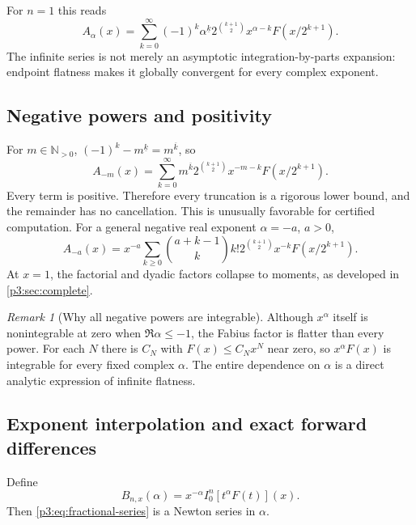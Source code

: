 \documentclass[11pt,oneside]{article}
\theoremstyle{definition}
\theoremstyle{remark}
\newtheorem{remark}[theorem]{Remark}
\newcommand{\N}{\mathbb N}
\newcommand{\fall}[2]{#1^{\underline{#2}}}
\newcommand{\rise}[2]{#1^{\overline{#2}}}
\newcommand{\1}{\mathbf 1}
\begin{document}
For $n=1$ this reads
\begin{equation}
 \boxed{
 A_\alpha(x)=
 \sum_{k=0}^{\infty}(-1)^k\fall\alpha k
 2^{\binom{k+1}{2}}x^{\alpha-k}F(x/2^{k+1}).}
 \label{p3:eq:A-series}
\end{equation}
The infinite series is not merely an asymptotic integration-by-parts expansion: endpoint
flatness makes it globally convergent for every complex exponent.

\subsection{Negative powers and positivity}

For $m\in\N_{>0}$, $(-1)^k\fall{-m}k=\rise mk$, so
\begin{equation}
 \boxed{
 A_{-m}(x)=\sum_{k=0}^{\infty}\rise mk
 2^{\binom{k+1}{2}}x^{-m-k}F(x/2^{k+1}).}
 \label{p3:eq:negative-integer-series}
\end{equation}
Every term is positive.  Therefore every truncation is a rigorous lower bound, and the
remainder has no cancellation.  This is unusually favorable for certified computation.
For a general negative real exponent $\alpha=-a$, $a>0$,
\begin{equation}
 A_{-a}(x)=x^{-a}\sum_{k\ge0}\binom{a+k-1}{k}k!
 2^{\binom{k+1}{2}}x^{-k}F(x/2^{k+1}).                       \label{p3:eq:negative-real-series}
\end{equation}
At $x=1$, the factorial and dyadic factors collapse to moments, as developed in
\cref{p3:sec:complete}.

\begin{remark}[Why all negative powers are integrable]
Although $x^\alpha$ itself is nonintegrable at zero when $\Re\alpha\le-1$, the Fabius factor
is flatter than every power.  For each $N$ there is $C_N$ with $F(x)\le C_Nx^N$ near zero,
so $x^\alpha F(x)$ is integrable for every fixed complex $\alpha$.  The entire dependence on
$\alpha$ is a direct analytic expression of infinite flatness.
\end{remark}

\subsection{Exponent interpolation and exact forward differences}

Define
\begin{equation}
 B_{n,x}(\alpha)=x^{-\alpha}I_0^n[t^\alpha F(t)](x).           \label{p3:eq:Bnx}
\end{equation}
Then \eqref{p3:eq:fractional-series} is a Newton series in $\alpha$.
\end{document}

